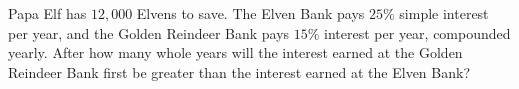 Papa Elf has $12{,}000$ Elvens to save. The Elven Bank pays $25\%$ simple interest per year, and the Golden Reindeer Bank pays $15\%$ interest per year, compounded yearly. After how many whole years will the interest earned at the Golden Reindeer Bank first be greater than the interest earned at the Elven Bank?
